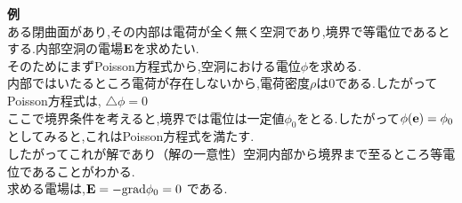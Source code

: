 \documentclass[../main]{subfiles}
\begin{document}
{\bf 例} \\
ある閉曲面があり,その内部は電荷が全く無く空洞であり,境界で等電位であるとする.内部空洞の電場${\bf E}$を求めたい. \\
そのためにまずPoisson方程式から,空洞における電位$\phi$を求める. \\
内部ではいたるところ電荷が存在しないから,電荷密度$\rho$は0である.したがってPoisson方程式は, $\bigtriangleup \phi = 0$ \\
ここで境界条件を考えると,境界では電位は一定値$\phi_0$をとる.したがって$\phi({\bf e}) = \phi_0$としてみると,これはPoisson方程式を満たす. \\
したがってこれが解であり（解の一意性）空洞内部から境界まで至るところ等電位であることがわかる. \\
求める電場は,${\bf E} = - {\rm grad} \phi_0 = 0$ である.
\end{document}
